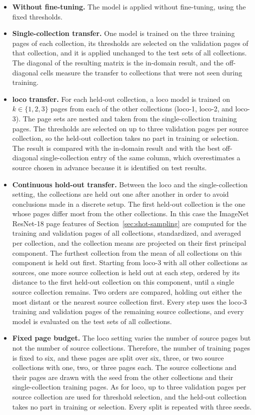 \begin{itemize}
    \item \textbf{Without fine-tuning.} The model is applied without fine-tuning, using the fixed thresholds.
    \item \textbf{Single-collection transfer.} One model is trained on the three training pages of each collection, its thresholds are selected on the validation pages of that collection, and it is applied unchanged to the test sets of all collections. The diagonal of the resulting matrix is the in-domain result, and the off-diagonal cells measure the transfer to collections that were not seen during training.
    \item \textbf{\Gls{loco} transfer.} For each held-out collection, a \gls{loco} model is trained on \(k\in\{1,2,3\}\) pages from each of the other collections (\gls{loco}-1, \gls{loco}-2, and \gls{loco}-3). The page sets are nested and taken from the single-collection training pages. The thresholds are selected on up to three validation pages per source collection, so the held-out collection takes no part in training or selection. The result is compared with the in-domain result and with the best off-diagonal single-collection entry of the same column, which overestimates a source chosen in advance because it is identified on test results.
    \item \textbf{Continuous hold-out transfer.} Between the \gls{loco} and the single-collection setting, the collections are held out one after another in order to avoid conclusions made in a discrete setup. The first held-out collection is the one whose pages differ most from the other collections. In this case the ImageNet ResNet-18 page features of Section~\ref{sec:shot-sampling} are computed for the training and validation pages of all collections, standardized, and averaged per collection, and the collection means are projected on their first principal component. The furthest collection from the mean of all collections on this component is held out first. Starting from \gls{loco}-3 with all other collections as sources, one more source collection is held out at each step, ordered by its distance to the first held-out collection on this component, until a single source collection remains. Two orders are compared, holding out either the most distant or the nearest source collection first. Every step uses the \gls{loco}-3 training and validation pages of the remaining source collections, and every model is evaluated on the test sets of all collections.
    \item \textbf{Fixed page budget.} The \gls{loco} setting varies the number of source pages but not the number of source collections. Therefore, the number of training pages is fixed to six, and these pages are split over six, three, or two source collections with one, two, or three pages each. The source collections and their pages are drawn with the seed from the other collections and their single-collection training pages. As for \gls{loco}, up to three validation pages per source collection are used for threshold selection, and the held-out collection takes no part in training or selection. Every split is repeated with three seeds.
\end{itemize}

